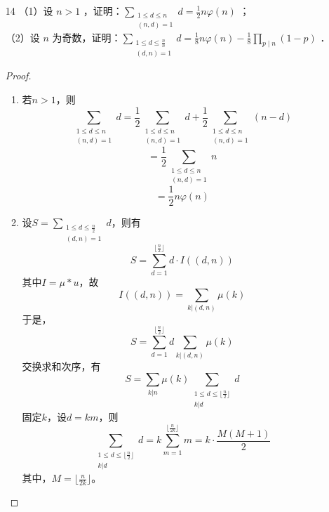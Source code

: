 \begin{enumerate}
\begin{proof}
\begin{enumerate}
            \item $\sum\limits_{d|n}\mu(d)\varphi(d)=(-1)^{\omega(n)}\prod\limits_{p|n}(p-2)$。\\
            设$g=\mu*\varphi$，则$g$为积性函数，且$g(n)=\sum\limits_{d|n}\mu(d)\varphi(d)$。\\
            设$n=p^\alpha$，则有：
            \[g(p^\alpha)=\begin{cases}
                1, & \alpha=0\\
                2-p, & \alpha\geq 1
            \end{cases}\]
            若$m=p_1^{\alpha_1}p_2^{\alpha_2}\cdots p_s^{\alpha_s}$，则
            \[g(m)=g(p_1^{\alpha_1})g(p_2^{\alpha_2})\cdots g(p_s^{\alpha_s})=(-1)^{\omega(m)}\prod\limits_{p|m}(p-2)\]
            即
            \[\sum\limits_{d|n}\mu(d)\varphi(d)=(-1)^{\omega(n)}\prod\limits_{p|n}(p-2)\]
        \end{enumerate}
    \end{proof}
    \item[14] （1）设 $n>1$ ，证明：$\sum_{\substack{1 \leqslant d \leqslant n \\(n, d)=1}} d=\frac{1}{2} n \varphi(n)$ ；\\
    （2）设 $n$ 为奇数，证明：$\sum_{\substack{1 \leqslant d \leqslant \frac{n}{n} \\(d, n)=1}} d=\frac{1}{8} n \varphi(n)-\frac{1}{8} \prod_{p \mid n}(1-p)$ ．
    \begin{proof}
        \begin{enumerate}
            \item 若$n>1$，则
            \[\sum\limits_{\substack{1\leq d\leq n\\(n,d)=1}}d=\frac{1}{2}\sum\limits_{\substack{1\leq d\leq n\\(n,d)=1}}d+\frac{1}{2}\sum\limits_{\substack{1\leq d\leq n\\(n,d)=1}}(n-d)\]
            \[=\frac{1}{2}\sum\limits_{\substack{1\leq d\leq n\\(n,d)=1}}n\]
            \[=\frac{1}{2}n\varphi(n)\]
            
            \item 设$S=\sum\limits_{\substack{1\leq d\leq \frac{n}{2}\\(d,n)=1}}d$，则有
            \[S=\sum\limits_{d=1}^{\lfloor \frac{n}{2} \rfloor}d\cdot I((d,n))\]
            其中$I=\mu*u$，故
            \[I((d,n))=\sum\limits_{k|(d,n)}\mu(k)\]
            于是，
            \[S=\sum\limits_{d=1}^{\lfloor \frac{n}{2} \rfloor}d\sum\limits_{k|(d,n)}\mu(k)\]
            交换求和次序，有
            \[S=\sum\limits_{k|n}\mu(k)\sum\limits_{\substack{1\leq d\leq \lfloor \frac{n}{2} \rfloor\\k|d}}d\]
            固定$k$，设$d=km$，则
            \[\sum\limits_{\substack{1\leq d\leq \lfloor \frac{n}{2} \rfloor\\k|d}}d=k\sum\limits_{m=1}^{\lfloor\frac{n}{2k}\rfloor}m=k\cdot\frac{M(M+1)}{2}\]
            其中，$M=\lfloor\frac{n}{2k}\rfloor$。
            

\end{enumerate}
\end{proof}
\end{enumerate}
